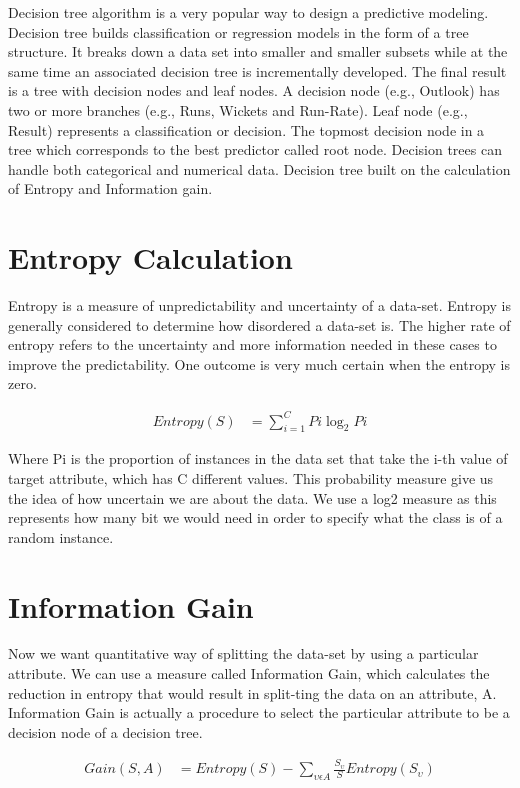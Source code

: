 Decision tree algorithm is a very popular way to design a predictive modeling. Decision tree builds classification or regression models in the form of a tree structure. It breaks down a data set into smaller and smaller subsets while at the same time an associated decision tree is incrementally developed. The final result is a tree with decision nodes and leaf nodes. A decision node (e.g., Outlook) has two or more branches (e.g., Runs, Wickets and Run-Rate). Leaf node (e.g., Result) represents a classification or decision. The topmost decision node in a tree which corresponds to the best predictor called root node. Decision trees can handle both categorical and numerical data. Decision tree built on the calculation of Entropy and Information gain.

\section{Entropy Calculation}
Entropy is a measure of unpredictability and uncertainty of a data-set. Entropy is generally considered to determine how disordered a data-set is. The higher rate of entropy refers to the uncertainty and more information needed in these cases to improve the predictability. One outcome is very much certain when the entropy is zero.

\begin{align}
    Entropy(S) &= \sum_{i=1}^{C} Pi \log_{2} Pi 
\end{align}
    
Where Pi is the proportion of instances in the data set that take the i-th value of target attribute, which has C different values. This probability measure give us the idea of how uncertain we are about the data. We use a log2 measure as this represents how many bit we would need in order to specify what the class is of a random instance.

\section{Information Gain}
Now we want quantitative way of splitting the data-set by using a particular attribute. We can use a measure called Information Gain, which calculates the reduction in entropy that would result in split-ting the data on an attribute, A. Information Gain is actually a procedure to select the particular attribute to be a decision node of a decision tree.

\begin{align}
   Gain(S, A) &= Entropy(S) - \sum_{\upsilon \epsilon A} \frac{S_{\upsilon}}{S} Entropy(S_{\upsilon})
\end{align}

